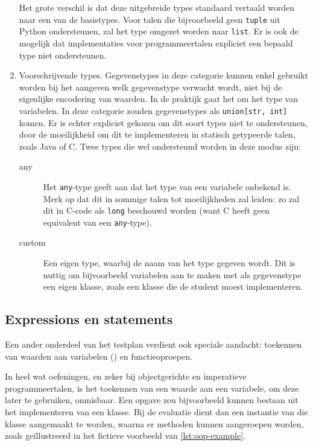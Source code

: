 \begin{enumerate}
    Het grote verschil is dat deze uitgebreide types standaard vertaald worden naar een van de basistypes.
    Voor talen die bijvoorbeeld geen \texttt{tuple} uit Python ondersteunen, zal het type omgezet worden naar \texttt{list}.
    Er is ook de mogelijk dat implementaties voor programmeertalen expliciet een bepaald type niet ondersteunen.
    \item Voorschrijvende types.
    Gegevenstypes in deze categorie kunnen enkel gebruikt worden bij het aangeven welk gegevenstype verwacht wordt, niet bij de eigenlijke encodering van waarden.
    In de praktijk gaat het om het type van variabelen.
    In deze categorie zouden gegevenstypes als \texttt{union[str, int]} komen.
    Er is echter expliciet gekozen om dit soort types niet te ondersteunen, door de moeilijkheid om dit te implementeren in statisch getypeerde talen, zoals Java of C\@.
    Twee types die wel ondersteund worden in deze modus zijn:
    \begin{description}
        \item[any] Het \texttt{any}-type geeft aan dat het type van een variabele onbekend is.
        Merk op dat dit in sommige talen tot moeilijkheden zal leiden: zo zal dit in C-code als \texttt{long} beschouwd worden (want C heeft geen equivalent van een \texttt{any}-type).
        \item[custom] Een eigen type, waarbij de naam van het type gegeven wordt.
        Dit is nuttig om bijvoorbeeld variabelen aan te maken met als gegevenstype een eigen klasse, zoals een klasse die de student moest implementeren.
    \end{description}
\end{enumerate}



\subsection{Expressions en statements}\label{subsec:expressions-and-statements}

Een ander onderdeel van het testplan verdient ook speciale aandacht: toekennen van waarden aan variabelen () en functieoproepen.

In heel wat oefeningen, en zeker bij objectgerichte en imperatieve programmeertalen, is het toekennen van een waarde aan een variabele, om deze later te gebruiken, onmisbaar.
Een opgave zou bijvoorbeeld kunnen bestaan uit het implementeren van een klasse.
Bij de evaluatie dient dan een instantie van die klasse aangemaakt te worden, waarna er methoden kunnen aangeroepen worden, zoals geïllustreerd in het fictieve voorbeeld van \cref{lst:oop-example}.

